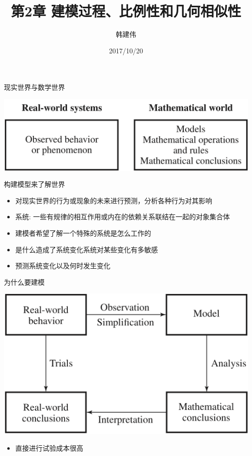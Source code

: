 \documentclass[UTF8, mathserif]{ctexbeamer}
\title{第2章 建模过程、比例性和几何相似性}
\author{韩建伟}
\institute{
  计信学院\\
  \texttt{mm@hanjianwei.com}
}
\date{2017/10/20}
\begin{document}
\begin{frame}[plain]
  \titlepage{}
\end{frame}

\begin{frame}{现实世界与数学世界}

  \begin{center}
    \includegraphics[width=.5\textwidth{}]{real_and_math.png}
  \end{center}

  构建模型来了解世界

  \begin{itemize}
  \item 对现实世界的行为或现象的未来进行预测，分析各种行为对其影响
  \item 系统: 一些有规律的相互作用或内在的依赖关系联结在一起的对象集合体
  \item 建模者希望了解一个特殊的系统是怎么工作的
  \item 是什么造成了系统变化系统对某些变化有多敏感
  \item 预测系统变化以及何时发生变化
  \end{itemize}

\end{frame}

\begin{frame}{为什么要建模}
  \begin{center}
    \includegraphics[width=.5\textwidth{}]{whymm.png}
  \end{center}

  \begin{itemize}
  \item 直接进行试验成本很高
  \end{itemize}
\end{frame}
\end{document}
